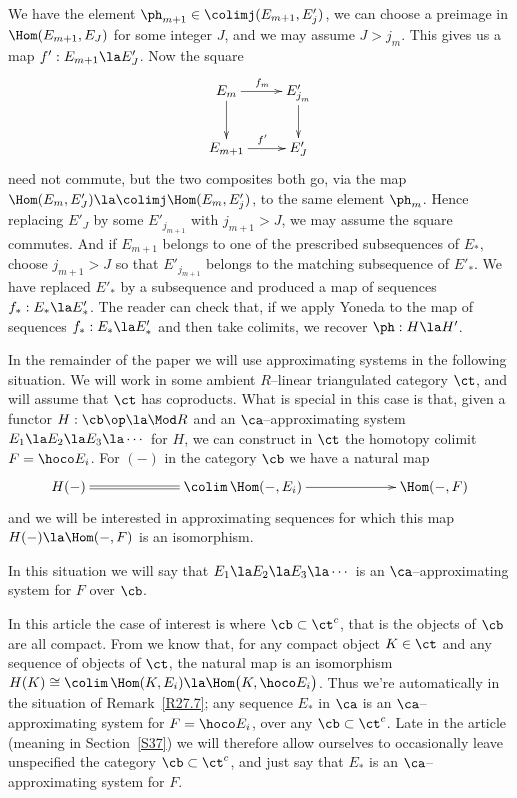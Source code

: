 \documentclass[11pt]{amsart}
\begin{document}
  We have the element $\ph_{m+1}\in\colimj(E_{m+1},E'_j)$, we
  can choose a preimage in $\Hom(E_{m+1}, E_J)$ for some integer $J$,
  and we may assume $J>j_{m}^{}$. This gives us a map
  $f':E_{m+1}\la E'_J$. Now the square
  \[\xymatrix{
E_m\ar[r]^{f_m}\ar[d] & E'_{j_m^{}}\ar[d] \\
E_{m+1}\ar[r]^{f'}   & E'_J
  }\]
  need not commute, but the two composites both go, via the map
  $\Hom(E_m,E'_J)\la \colimj\Hom(E_m,E'_j)$, to the same element $\ph_m$.
  Hence replacing $E'_J$ by some $E'_{j_{m+1}^{}}$ with ${j_{m+1}^{}}>J$,
  we may assume the square commutes. And if $E_{m+1}$ belongs to one of
  the prescribed subsequences of $E_*$, choose ${j_{m+1}^{}}>J$ so that
  $E'_{j_{m+1}^{}}$ belongs to the matching subsequence of $E'_*$.
\ee
We have replaced $E'_*$ by a subsequence and produced a map of sequences
$f_*:E_*\la E'_*$.
The reader can check that, if we apply Yoneda to the map of
sequences $f_*:E_*\la E'_*$ and then take colimits, we recover
$\ph:H\la H'$.
\eprf


In the remainder of the paper we will
use approximating systems in the following situation.
We will work in some ambient $R$--linear triangulated category $\ct$,
and will assume that $\ct$ has coproducts.
What is special in this case is that, given a functor $H:\cb\op\la\Mod R$
and an $\ca$--approximating
system $E_1\la E_2\la E_3\la\cdots$ for $H$, we can construct in
$\ct$ the homotopy colimit $F=\hoco E_i$.
For $(-)$ in the category $\cb$ we  have a natural map
\[\xymatrix@C+40pt{
H(-)\ar@{=}[r] & \colim\,\Hom(-,E_i)\ar[r] & \Hom(-,F)
}\]
and we will be interested in approximating sequences for which this
map $H(-)\la \Hom(-,F)$ is an isomorphism.


In this situation we will say that $E_1\la E_2\la E_3\la\cdots$
is an $\ca$--approximating system for $F$ over $\cb$. 
\ermk

In this article the case of interest is where 
$\cb\subset\ct^c$, that is the objects of $\cb$ are all compact.
From
\cite[Lemma~2.8]{Neeman96} we know that, for any compact
object $K\in\ct$ and any sequence of objects of $\ct$,
the natural map is an isomorphism
$H(K)\cong\colim\,\Hom(K,E_i)\la \Hom\big(K,\hoco E_i\big)$.
Thus we're automatically in the situation of Remark~\ref{R27.7};
any sequence $E_*$ in $\ca$ is an $\ca$--approximating system for
$F=\hoco E_i$, over any $\cb\subset\ct^c$. Late in the article
(meaning in Section~\ref{S37}) we
will therefore
allow ourselves to occasionally leave unspecified the category
$\cb\subset\ct^c$, and just say that $E_*$ is an $\ca$--approximating
system for $F$.
\end{document}
